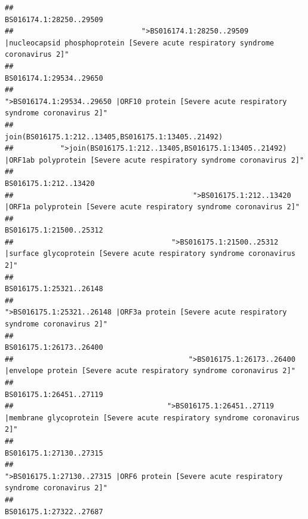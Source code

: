 \documentclass[
]{article}
\begin{document}
\begin{verbatim}
##                                                                                                                BS016174.1:28250..29509 
##                              ">BS016174.1:28250..29509 |nucleocapsid phosphoprotein [Severe acute respiratory syndrome coronavirus 2]" 
##                                                                                                                BS016174.1:29534..29650 
##                                            ">BS016174.1:29534..29650 |ORF10 protein [Severe acute respiratory syndrome coronavirus 2]" 
##                                                                                    join(BS016175.1:212..13405,BS016175.1:13405..21492) 
##           ">join(BS016175.1:212..13405,BS016175.1:13405..21492) |ORF1ab polyprotein [Severe acute respiratory syndrome coronavirus 2]" 
##                                                                                                                  BS016175.1:212..13420 
##                                          ">BS016175.1:212..13420 |ORF1a polyprotein [Severe acute respiratory syndrome coronavirus 2]" 
##                                                                                                                BS016175.1:21500..25312 
##                                     ">BS016175.1:21500..25312 |surface glycoprotein [Severe acute respiratory syndrome coronavirus 2]" 
##                                                                                                                BS016175.1:25321..26148 
##                                            ">BS016175.1:25321..26148 |ORF3a protein [Severe acute respiratory syndrome coronavirus 2]" 
##                                                                                                                BS016175.1:26173..26400 
##                                         ">BS016175.1:26173..26400 |envelope protein [Severe acute respiratory syndrome coronavirus 2]" 
##                                                                                                                BS016175.1:26451..27119 
##                                    ">BS016175.1:26451..27119 |membrane glycoprotein [Severe acute respiratory syndrome coronavirus 2]" 
##                                                                                                                BS016175.1:27130..27315 
##                                             ">BS016175.1:27130..27315 |ORF6 protein [Severe acute respiratory syndrome coronavirus 2]" 
##                                                                                                                BS016175.1:27322..27687 

\end{verbatim}
\end{document}
